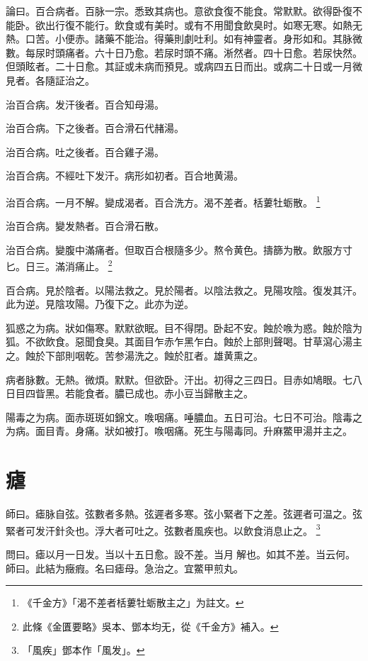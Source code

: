 論曰。百合病者。百脉一宗。悉致其病也。意欲食復不能食。常默默。欲得卧復不能卧。欲出行復不能行。飲食或有美时。或有不用聞食飲臭时。如寒无寒。如熱无熱。口苦。小便赤。諸藥不能治。得藥則劇吐利。如有神靈者。身形如和。其脉微數。每尿时頭痛者。六十日乃愈。若尿{\khaai 时}頭不痛。淅然者。四十日愈。若尿快然。但頭眩者。二十日愈。其証或未病而預見。或病四五日而出。或病二十日或一月微見者。各隨証治之。

治百合病。发汗後者。百合知母湯。

治百合病。下之後者。百合滑石代赭湯。

治百合病。吐之後者。百合雞子湯。

治百合病。不經吐下发汗。病形如初者。百合地黄湯。

治百合病。一月不解。變成渴者。百合洗方。渴不差者。栝蔞牡蛎散。
	\footnote{
		《千金方》「渴不差者栝蔞牡蛎散主之」为註文。
	}

治百合病。變发熱者。百合滑石散。

治百合病。變腹中滿痛者。但取百合根隨多少。熬令黄色。擣篩为散。飲服方寸匕。日三。滿消痛止。
	\footnote{
		此條《金匱要略》吳本、鄧本均无，從《千金方》補入。
	}

百合病。見於陰者。以陽法救之。見於陽者。以陰法救之。見陽攻陰。復发其汗。此为逆。見陰攻陽。乃復下之。此亦为逆。

狐惑之为病。狀如傷寒。默默欲眠。目不得閉。卧起不安。蝕於㗋为惑。蝕於陰为狐。不欲飲食。惡聞食臭。其面目乍赤乍黑乍白。蝕於上部則聲喝。甘草瀉心湯主之。蝕於下部則咽乾。苦参湯洗之。蝕於肛者。雄黄熏之。

病者脉數。无熱。微煩。默默。但欲卧。汗出。初得之三四日。目赤如鳩眼。七八日目四眥黑。若能食者。膿已成也。赤小豆当歸散主之。

陽毒之为病。面赤斑斑如錦文。㗋咽痛。唾膿血。五日可治。七日不可治。陰毒之为病。面目青。身痛。狀如被打。㗋咽痛。死生与陽毒同。升麻鱉甲湯并主之。

\chapter{瘧}

師曰。瘧脉自弦。弦數者多熱。弦遲者多寒。弦小緊者下之差。弦遲者可温之。弦緊者可发汗針灸也。浮大者可吐之。弦數者風疾也。以飲食消息止之。
	\footnote{
		「風疾」鄧本作「風发」。
	}

問曰。瘧以月一日发。当以十五日愈。設不差。当月{\sungii 𥁞}解也。如其不差。当云何。\\
師曰。此結为癥瘕。名曰瘧母。急治之。宜鱉甲煎丸。


